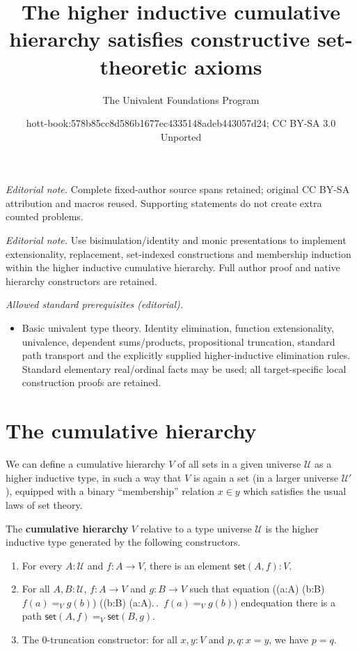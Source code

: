 \documentclass[10pt,a4paper]{article}
\title{The higher inductive cumulative hierarchy satisfies constructive set-theoretic axioms}
\author{The Univalent Foundations Program}
\date{hott-book:578b85cc8d586b1677ec4335148adeb443057d24; CC BY-SA 3.0 Unported}
\makeatletter
\newcounter{chapter}
\providecommand{\index}[1]{}
\newcommand{\define}[1]{\textbf{#1}}
\def\fall#1{\forall (#1)\@ifnextchar\bgroup{.\,\fall}{.\,}}
\def\exis#1{\exists (#1)\@ifnextchar\bgroup{.\,\exis}{.\,}}
\newcommand{\id}[3][]{\ensuremath{#2 =_{#1} #3}\xspace}
\newcommand{\UU}{\ensuremath{\mathcal{U}}\xspace}
\newcommand{\vset}{\mathsf{set}}  %
\theoremstyle{definition}
\theoremstyle{remark}
\numberwithin{equation}{section}
\newcommand{\indexdef}[1]{\index{#1|defstyle}}   %
\newcommand{\narrowbreak}{}
\newenvironment{narrowmultline}{\csname equation\endcsname}{\csname endequation\endcsname}
\makeatother
\begin{document}
\maketitle
\setcounter{chapter}{10}
\setcounter{section}{0}
\setcounter{thm}{0}
\noindent\textit{Editorial note.} Complete fixed-author source spans retained; original CC BY-SA attribution and macros reused. Supporting statements do not create extra counted problems.\par\medskip
\noindent\textit{Editorial note.} Use bisimulation/identity and monic presentations to implement extensionality, replacement, set-indexed constructions and membership induction within the higher inductive cumulative hierarchy. Full author proof and native hierarchy constructors are retained.\par\medskip
\noindent\textit{Allowed standard prerequisites (editorial).}\begin{itemize}
\item Basic univalent type theory. Identity elimination, function extensionality, univalence, dependent sums/products, propositional truncation, standard path transport and the explicitly supplied higher-inductive elimination rules. Standard elementary real/ordinal facts may be used; all target-specific local construction proofs are retained.
\end{itemize}\medskip
\section{The cumulative hierarchy}
\label{sec:cumulative-hierarchy}

\index{bargaining|(}%
We can define a cumulative hierarchy $V$ of all sets in a given universe $\UU$ as a higher inductive type, in such a way that $V$ is again a set (in a larger universe $\UU'$), equipped with a binary ``membership'' relation $x\in y$ which satisfies the usual laws of set theory.

\begin{defn}\label{defn:V}
  The \define{cumulative hierarchy}
  \indexdef{cumulative!hierarchy, set-theoretic}%
  \indexdef{hierarchy!cumulative, set-theoretic}%
  $V$ relative to a type universe $\UU$ is the
  higher inductive type generated by the following constructors.
  \begin{enumerate}
  \item For every $A : \UU$ and $f : A \to V$, there is an element $\vset(A, f) : V$.
  \item For all $A, B : \UU$, $f : A \to V$ and $g : B \to V$ such that
    \begin{narrowmultline} \label{eq:V-path}
      \big(\fall{a:A} \exis{b:B} \id[V]{f(a)}{g(b)}\big) \land \narrowbreak
      \big(\fall{b:B} \exis{a:A} \id[V]{f(a)}{g(b)}\big)
    \end{narrowmultline}
    there is a path $\id[V]{\vset(A,f)}{\vset(B,g)}$.
  \item The 0-truncation constructor: for all $x,y:V$ and $p,q:x=y$, we have $p=q$.
  \end{enumerate}
\end{defn}
\end{document}
